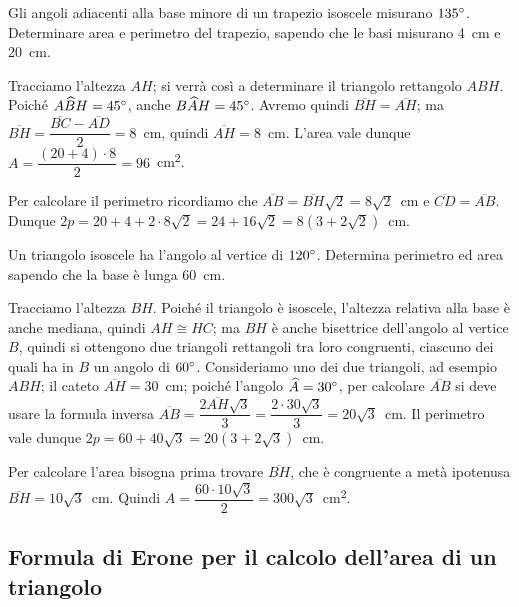 \begin{exrig}
\begin{esempio}
Gli angoli adiacenti alla base minore di un trapezio isoscele misurano $135{}^{\circ}$. Determinare area e perimetro del trapezio, sapendo che le basi misurano 4~cm e 20~cm.\vspace{7pt}

Tracciamo l'altezza $AH$; si verrà così a determinare il triangolo rettangolo $ABH$. Poiché $A\widehat{B}H=45{}^{\circ}$, anche $B\widehat{A}H=45{}^{\circ}$. Avremo quindi $\overline{BH}=\overline{AH}$; ma $\overline{BH}=\dfrac{\overline{BC}-\overline{AD}}{2}=8$~cm, quindi $\overline{AH}=8$~cm. L'area vale dunque $A=\dfrac{(20+4)\cdot 8}{2}=96$~cm\textsuperscript{2}.

Per calcolare il perimetro ricordiamo che $\overline{AB}=\overline{BH}\sqrt{2}=8\sqrt{2}$~cm e $\overline{CD}=\overline{AB}$.
Dunque $2p=20+4+2\cdot 8\sqrt{2}=24+16\sqrt{2}=8(3+2\sqrt{2})$~cm.
\end{esempio}

\begin{esempio}
Un triangolo isoscele ha l'angolo al vertice di $120{}^{\circ}$. Determina perimetro ed area sapendo che la base è lunga 60~cm.\vspace{7pt}

Tracciamo l'altezza $BH$. Poiché il triangolo è isoscele, l'altezza relativa alla base è anche mediana, quindi $AH\cong HC$; ma $BH$ è anche bisettrice dell'angolo al vertice $B$, quindi si ottengono due triangoli rettangoli tra loro congruenti, ciascuno dei quali ha in $B$ un angolo di $60{}^{\circ}$. Consideriamo uno dei due triangoli, ad esempio $ABH$; il cateto $\overline{AH}=30$~cm; poiché l'angolo $\widehat{A}=30{}^{\circ}$, per calcolare $\overline{AB}$ si deve usare la formula inversa $\overline{AB}=\dfrac{2\overline{AH}\sqrt{3}}{3}=\dfrac{2\cdot 30\sqrt{3}}{3}=20\sqrt{3}$~cm.
Il perimetro vale dunque $2p=60 + 40\sqrt{3} = 20 (3 + 2\sqrt{3})$~cm.

Per calcolare l'area bisogna prima trovare $\overline{BH}$, che è congruente a metà ipotenusa $\overline{BH}=10\sqrt{3}$~cm. Quindi $A=\dfrac{60\cdot 10\sqrt{3}}{2}=300\sqrt{3}$~cm\textsuperscript{2}.
\end{esempio}
\end{exrig}

\subsection{Formula di Erone per il calcolo dell'area di un triangolo}

